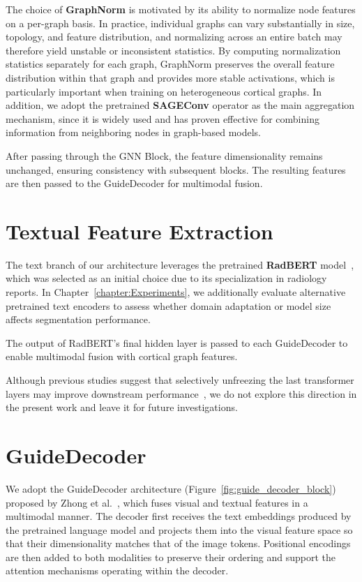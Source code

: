 \documentclass[FCD_GNN.tex]{subfiles}
\begin{document}
The choice of \textbf{GraphNorm} is motivated by its ability to normalize node features on a per-graph basis. 
In practice, individual graphs can vary substantially in size, topology, and feature distribution, 
and normalizing across an entire batch may therefore yield unstable or inconsistent statistics. 
By computing normalization statistics separately for each graph, GraphNorm preserves the overall 
feature distribution within that graph and provides more stable activations, which is particularly 
important when training on heterogeneous cortical graphs. 
In addition, we adopt the pretrained \textbf{SAGEConv} operator as the main aggregation mechanism, since it is 
widely used and has proven effective for combining information from neighboring nodes in graph-based models.

After passing through the GNN Block, the feature dimensionality remains unchanged, ensuring consistency with subsequent blocks. The resulting features are then passed to the GuideDecoder for multimodal fusion.

\section{Textual Feature Extraction}

The text branch of our architecture leverages the pretrained \textbf{RadBERT} model~\cite{Park2022AIforNeuro}, 
which was selected as an initial choice due to its specialization in radiology reports.  
In Chapter~\ref{chapter:Experiments}, we additionally evaluate alternative pretrained 
text encoders to assess whether domain adaptation or model size affects segmentation performance.

The output of RadBERT’s final hidden layer is passed to each GuideDecoder to enable multimodal fusion 
with cortical graph features.

Although previous studies suggest that selectively unfreezing the last transformer layers may 
improve downstream performance~\cite{Peters2019ToTune}, we do not explore this direction in the present work 
and leave it for future investigations.


\section{GuideDecoder}
We adopt the GuideDecoder architecture (Figure~\ref{fig:guide_decoder_block}) 
proposed by Zhong et al.~\cite{Zhong2023Ariadne}, 
which fuses visual and textual features in a multimodal manner. 
The decoder first receives the text embeddings produced by the pretrained language model and 
projects them into the visual feature space so that their dimensionality matches that of the 
image tokens. 
Positional encodings are then added to both modalities to preserve their ordering and support the attention mechanisms operating within the decoder.
\end{document}
